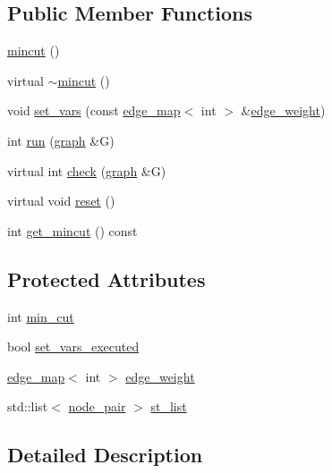 \subsection*{Public Member Functions}
\begin{DoxyCompactItemize}
\item 
\mbox{\hyperlink{classmincut_a9761193cdb9c6f3f675d70fb0ef3afc8}{mincut}} ()
\item 
virtual \mbox{\hyperlink{classmincut_a2d02e194571b58604409eeb7edf46438}{$\sim$mincut}} ()
\item 
void \mbox{\hyperlink{classmincut_a74f3619c8fcda145e7ec1f87d5dd5c66}{set\+\_\+vars}} (const \mbox{\hyperlink{classedge__map}{edge\+\_\+map}}$<$ int $>$ \&\mbox{\hyperlink{classmincut_a080162552b5350b4e42228c9d536904e}{edge\+\_\+weight}})
\item 
int \mbox{\hyperlink{classmincut_ab7e374a3f73387aa61587643a5f44e43}{run}} (\mbox{\hyperlink{classgraph}{graph}} \&G)
\item 
virtual int \mbox{\hyperlink{classmincut_a3a06737106ab6000360a1f799361691a}{check}} (\mbox{\hyperlink{classgraph}{graph}} \&G)
\item 
virtual void \mbox{\hyperlink{classmincut_a3f2142246a7b3e7b19b15d62314c9337}{reset}} ()
\item 
int \mbox{\hyperlink{classmincut_a7d61e51d9bcbfc620d88051250acbd77}{get\+\_\+mincut}} () const
\end{DoxyCompactItemize}
\subsection*{Protected Attributes}
\begin{DoxyCompactItemize}
\item 
int \mbox{\hyperlink{classmincut_a0d7cc01f8dd8b09c58dfb08c1123415f}{min\+\_\+cut}}
\item 
bool \mbox{\hyperlink{classmincut_adeef2b186f863ce70809a6731f09de04}{set\+\_\+vars\+\_\+executed}}
\item 
\mbox{\hyperlink{classedge__map}{edge\+\_\+map}}$<$ int $>$ \mbox{\hyperlink{classmincut_a080162552b5350b4e42228c9d536904e}{edge\+\_\+weight}}
\item 
std\+::list$<$ \mbox{\hyperlink{mincut_8h_a649cc9b1d7fcef0834a532960bc441a0}{node\+\_\+pair}} $>$ \mbox{\hyperlink{classmincut_a1ef91db99ffc99172ba5e1de2c452c81}{st\+\_\+list}}
\end{DoxyCompactItemize}


\subsection{Detailed Description}



